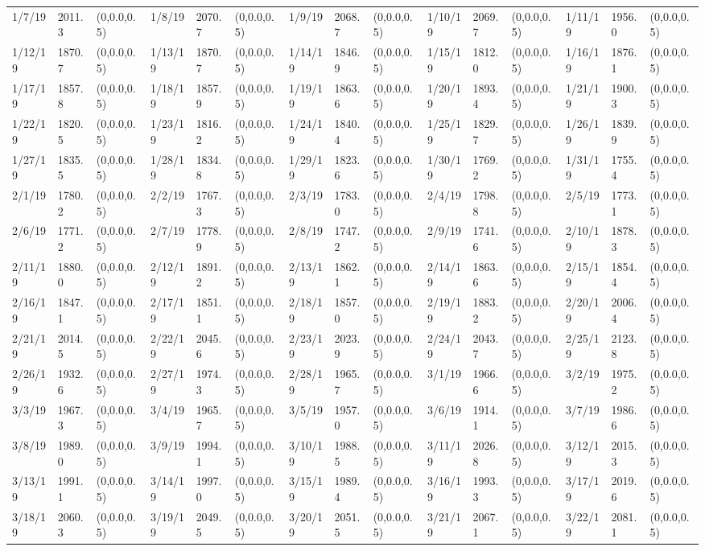 \documentclass[12pt]{article}
\begin{document}
\begin{table}
\begin{center}
\begin{tabular}{p{15pt}p{15pt}p{25pt}p{15pt}p{15pt}p{25pt}p{15pt}p{15pt}p{25pt}p{15pt}p{15pt}p{25pt}p{15pt}p{15pt}p{25pt}}
        1/7/19&2011.3&(0,0.0,0.5)&1/8/19&2070.7&(0,0.0,0.5)&1/9/19&2068.7&(0,0.0,0.5)&1/10/19&2069.7&(0,0.0,0.5)&1/11/19&1956.0&(0,0.0,0.5)\\
        1/12/19&1870.7&(0,0.0,0.5)&1/13/19&1870.7&(0,0.0,0.5)&1/14/19&1846.9&(0,0.0,0.5)&1/15/19&1812.0&(0,0.0,0.5)&1/16/19&1876.1&(0,0.0,0.5)\\
        1/17/19&1857.8&(0,0.0,0.5)&1/18/19&1857.9&(0,0.0,0.5)&1/19/19&1863.6&(0,0.0,0.5)&1/20/19&1893.4&(0,0.0,0.5)&1/21/19&1900.3&(0,0.0,0.5)\\
        1/22/19&1820.5&(0,0.0,0.5)&1/23/19&1816.2&(0,0.0,0.5)&1/24/19&1840.4&(0,0.0,0.5)&1/25/19&1829.7&(0,0.0,0.5)&1/26/19&1839.9&(0,0.0,0.5)\\
        1/27/19&1835.5&(0,0.0,0.5)&1/28/19&1834.8&(0,0.0,0.5)&1/29/19&1823.6&(0,0.0,0.5)&1/30/19&1769.2&(0,0.0,0.5)&1/31/19&1755.4&(0,0.0,0.5)\\
        2/1/19&1780.2&(0,0.0,0.5)&2/2/19&1767.3&(0,0.0,0.5)&2/3/19&1783.0&(0,0.0,0.5)&2/4/19&1798.8&(0,0.0,0.5)&2/5/19&1773.1&(0,0.0,0.5)\\
        2/6/19&1771.2&(0,0.0,0.5)&2/7/19&1778.9&(0,0.0,0.5)&2/8/19&1747.2&(0,0.0,0.5)&2/9/19&1741.6&(0,0.0,0.5)&2/10/19&1878.3&(0,0.0,0.5)\\
        2/11/19&1880.0&(0,0.0,0.5)&2/12/19&1891.2&(0,0.0,0.5)&2/13/19&1862.1&(0,0.0,0.5)&2/14/19&1863.6&(0,0.0,0.5)&2/15/19&1854.4&(0,0.0,0.5)\\
        2/16/19&1847.1&(0,0.0,0.5)&2/17/19&1851.1&(0,0.0,0.5)&2/18/19&1857.0&(0,0.0,0.5)&2/19/19&1883.2&(0,0.0,0.5)&2/20/19&2006.4&(0,0.0,0.5)\\
        2/21/19&2014.5&(0,0.0,0.5)&2/22/19&2045.6&(0,0.0,0.5)&2/23/19&2023.9&(0,0.0,0.5)&2/24/19&2043.7&(0,0.0,0.5)&2/25/19&2123.8&(0,0.0,0.5)\\
        2/26/19&1932.6&(0,0.0,0.5)&2/27/19&1974.3&(0,0.0,0.5)&2/28/19&1965.7&(0,0.0,0.5)&3/1/19&1966.6&(0,0.0,0.5)&3/2/19&1975.2&(0,0.0,0.5)\\
        3/3/19&1967.3&(0,0.0,0.5)&3/4/19&1965.7&(0,0.0,0.5)&3/5/19&1957.0&(0,0.0,0.5)&3/6/19&1914.1&(0,0.0,0.5)&3/7/19&1986.6&(0,0.0,0.5)\\
        3/8/19&1989.0&(0,0.0,0.5)&3/9/19&1994.1&(0,0.0,0.5)&3/10/19&1988.5&(0,0.0,0.5)&3/11/19&2026.8&(0,0.0,0.5)&3/12/19&2015.3&(0,0.0,0.5)\\
        3/13/19&1991.1&(0,0.0,0.5)&3/14/19&1997.0&(0,0.0,0.5)&3/15/19&1989.4&(0,0.0,0.5)&3/16/19&1993.3&(0,0.0,0.5)&3/17/19&2019.6&(0,0.0,0.5)\\
        3/18/19&2060.3&(0,0.0,0.5)&3/19/19&2049.5&(0,0.0,0.5)&3/20/19&2051.5&(0,0.0,0.5)&3/21/19&2067.1&(0,0.0,0.5)&3/22/19&2081.1&(0,0.0,0.5)\\

\end{tabular}
\end{center}
\end{table}
\end{document}

